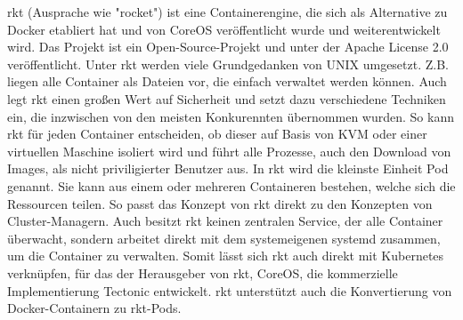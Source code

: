 rkt (Ausprache wie "rocket") ist eine Containerengine, die sich als Alternative zu Docker etabliert hat und von CoreOS veröffentlicht wurde und weiterentwickelt wird. Das Projekt ist ein Open-Source-Projekt und unter der Apache License 2.0 veröffentlicht. \citep{RepoRkt} Unter rkt werden viele Grundgedanken von UNIX umgesetzt. Z.B. liegen alle Container als Dateien vor, die einfach verwaltet werden können. Auch legt rkt einen großen Wert auf Sicherheit und setzt dazu verschiedene Techniken ein, die inzwischen von den meisten Konkurennten übernommen wurden. So kann rkt für jeden Container entscheiden, ob dieser auf Basis von KVM oder einer virtuellen Maschine isoliert wird und führt alle Prozesse, auch den Download von Images, als nicht priviligierter Benutzer aus. In rkt wird die kleinste Einheit Pod genannt. Sie kann aus einem oder mehreren Containeren bestehen, welche sich die Ressourcen teilen. So passt das Konzept von  rkt direkt zu den Konzepten von  Cluster-Managern. Auch besitzt rkt keinen zentralen Service, der alle Container überwacht, sondern arbeitet direkt mit dem systemeigenen systemd zusammen, um die Container zu verwalten. Somit lässt sich rkt auch direkt mit Kubernetes verknüpfen, für das der Herausgeber von rkt, CoreOS, die kommerzielle Implementierung Tectonic entwickelt. rkt unterstützt auch die Konvertierung von Docker-Containern zu rkt-Pods. \citep{HomepageRkt,ixrkt}

